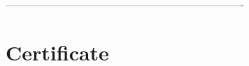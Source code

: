 \documentclass[letterpaper]{twentysecondcv} %
\begin{document}
-------------------------------------------------------------------------

\section{Certificate}

\begin{twenty} %
\end{twenty}









\end{document}
